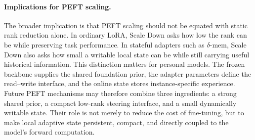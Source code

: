 \documentclass{llmxive}
\begin{document}
\paragraph{Implications for PEFT scaling.}
The broader implication is that PEFT scaling should not be equated with static rank reduction alone. In ordinary LoRA, Scale Down asks how low the rank can be while preserving task performance. In stateful adapters such as $\delta$-mem, Scale Down also asks how small a writable local state can be while still carrying useful historical information. This distinction matters for personal models. The frozen backbone supplies the shared foundation prior, the adapter parameters define the read--write interface, and the online state stores instance-specific experience. Future PEFT mechanisms may therefore combine three ingredients: a strong shared prior, a compact low-rank steering interface, and a small dynamically writable state. Their role is not merely to reduce the cost of fine-tuning, but to make local adaptive state persistent, compact, and directly coupled to the model's forward computation.


\end{document}
